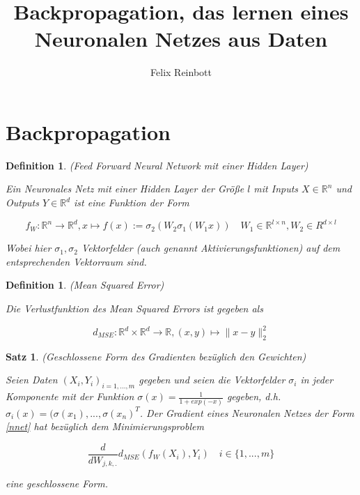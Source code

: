 \documentclass[a4paper,12pt]{article}
\title{Backpropagation, das lernen eines Neuronalen Netzes aus Daten}
\author{Felix Reinbott}
\newtheorem{Definition}[Lemma]{Definition}
\newtheorem{Satz}[Lemma]{Satz}
\newcommand{\R}{\mathbb{R}}
\begin{document}
\maketitle
\newpage

\section{Backpropagation}

\begin{Definition}(Feed Forward Neural Network mit einer Hidden Layer)

    Ein Neuronales Netz mit einer Hidden Layer der Größe $l$ mit Inputs $X \in \R^n$ und Outputs $Y \in \R^d$ ist eine Funktion der Form

    \begin{equation}\label{nnet}
        f_W \colon \R^n \to \R^d, x \mapsto f(x) := \sigma_2(W_2 \sigma_1(W_1x)) \quad W_1 \in \R^{l \times n}, W_2 \in R^{d \times l}
    \end{equation}

    Wobei hier $\sigma_1, \sigma_2$ Vektorfelder (auch genannt Aktivierungsfunktionen) auf dem entsprechenden Vektorraum sind.

\end{Definition}

\begin{Definition}(Mean Squared Error)

    Die Verlustfunktion des Mean Squared Errors ist gegeben als

    \begin{equation}
        d_{MSE} : \R^d \times \R^d \to \R, (x,y) \mapsto \|x - y\|_2^2
    \end{equation}

\end{Definition}

\begin{Satz}(Geschlossene Form des Gradienten bezüglich den Gewichten)

    Seien Daten $(X_i, Y_i)_{i = 1,...,m}$ gegeben und seien die Vektorfelder $\sigma_i$ in jeder Komponente mit der Funktion $\sigma(x) = \frac{1}{1 + exp(-x)}$ gegeben, d.h. $\sigma_i(x) = (\sigma(x_1),..., \sigma(x_n)^T$. Der Gradient eines Neuronalen Netzes der Form \eqref{nnet} hat bezüglich dem Minimierungsproblem

    \begin{equation}
        \frac{d}{d W_{j,k,.}} d_{MSE}(f_W(X_i), Y_i) \quad i \in \{1,...,m\} 
    \end{equation}

    eine geschlossene Form.

\end{Satz}
\end{document}
